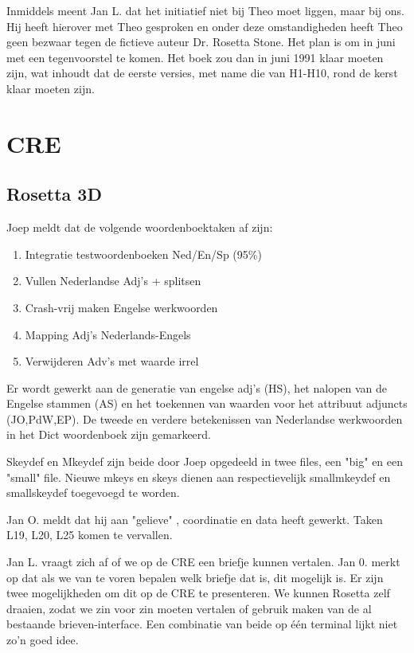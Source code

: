 Inmiddels meent Jan L. dat het 
initiatief niet bij Theo moet liggen, maar bij ons. Hij heeft hierover met Theo 
gesproken en onder deze omstandigheden heeft Theo geen bezwaar tegen de
fictieve auteur Dr. Rosetta Stone. Het plan is om in juni met een 
tegenvoorstel te komen.
Het boek zou dan in juni 1991 klaar moeten zijn, wat inhoudt dat de eerste 
versies, met name die van H1-H10, rond de kerst klaar moeten zijn.

\section {CRE}

\subsection {Rosetta 3D} 

Joep meldt dat de volgende woordenboektaken af zijn:
   \begin{enumerate}
   \item Integratie testwoordenboeken Ned/En/Sp (95\%)
   \item Vullen Nederlandse Adj's + splitsen
   \item Crash-vrij maken Engelse werkwoorden
   \item Mapping Adj's Nederlands-Engels
   \item Verwijderen Adv's met waarde irrel 
   \end{enumerate}
Er wordt gewerkt aan de generatie van engelse adj's (HS),  het nalopen van de 
Engelse stammen (AS) en het toekennen van waarden voor het attribuut adjuncts 
(JO,PdW,EP). De tweede en verdere betekenissen van Nederlandse werkwoorden in 
het Dict woordenboek zijn gemarkeerd.

Skeydef en Mkeydef zijn beide door Joep opgedeeld in twee files, een "big" en 
een "small" file. Nieuwe mkeys en skeys dienen aan respectievelijk smallmkeydef 
en smallskeydef toegevoegd te worden. 

Jan O. meldt dat hij aan "gelieve" , coordinatie en data heeft gewerkt.
Taken L19, L20, L25 komen te vervallen.

Jan L. vraagt zich af of we op de CRE een briefje kunnen vertalen. Jan 0. merkt 
op dat als we van te voren bepalen welk briefje dat is, dit mogelijk is. Er 
zijn twee mogelijkheden om dit op de CRE te presenteren. We kunnen Rosetta zelf 
draaien, zodat we zin voor zin moeten vertalen of gebruik maken van de al 
bestaande brieven-interface. Een combinatie van beide op \'{e}\'{e}n terminal 
lijkt niet zo'n goed idee.


